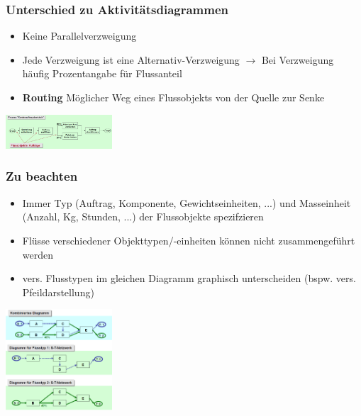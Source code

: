 \documentclass{report}
\newenvironment{Figure}
	{\par\medskip\noindent\minipage{\linewidth}}
	{\endminipage\par\medskip}
\theoremstyle{definition}
\theoremstyle{example}
\begin{document}
      \subsubsection{Unterschied zu Aktivitätsdiagrammen}
\begin{itemize}
   \item Keine Parallelverzweigung
   \item Jede Verzweigung ist eine Alternativ-Verzweigung $\rightarrow$ Bei Verzweigung häufig Prozentangabe für Flussanteil
   \item \textbf{Routing} Möglicher Weg eines Flussobjekts von der Quelle zur Senke 
\end{itemize}

\begin{Figure}
\centering
\includegraphics[width=150px]{img/BspFlussdiagramm.png}
	\label{fig:Beispiel eines Flussdiagramm}
\end{Figure}

      \subsubsection{Zu beachten}
\begin{itemize}
   \item Immer Typ (Auftrag, Komponente, Gewichtseinheiten, ...) und Masseinheit (Anzahl, Kg, Stunden, ...) der Flussobjekte spezifzieren
   \item Flüsse verschiedener Objekttypen/-einheiten können nicht zusammengeführt werden
   \item vers. Flusstypen im gleichen Diagramm graphisch unterscheiden (bspw. vers. Pfeildarstellung)
\end{itemize}

\begin{Figure}
\centering
\includegraphics[width=150px]{img/BspFlussdiagrammZweiTypen.png}
	\label{fig:Beispiel eines Flussdiagramm mit zwei Flusstypen}
\end{Figure}
\end{document}
